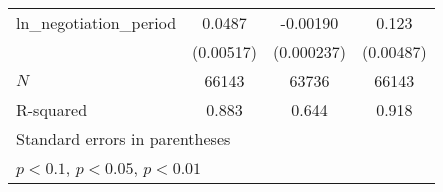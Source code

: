 {\begin{tabular}{l*{3}{c}}
\addlinespace
ln\_negotiation\_period&      0.0487\sym{***}&    -0.00190\sym{***}&       0.123\sym{***}\\
            &   (0.00517)         &  (0.000237)         &   (0.00487)         \\
\midrule
\(N\)       &       66143         &       63736         &       66143         \\
R-squared   &       0.883         &       0.644         &       0.918         \\
\bottomrule
\multicolumn{4}{l}{\footnotesize Standard errors in parentheses}\\
\multicolumn{4}{l}{\footnotesize \sym{*} \(p<0.1\), \sym{**} \(p<0.05\), \sym{***} \(p<0.01\)}\\
\end{tabular}
}
